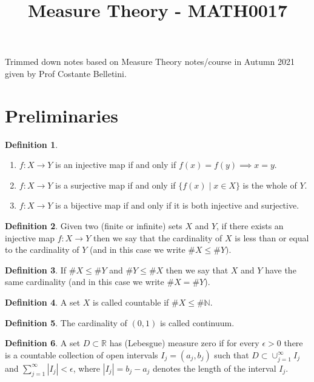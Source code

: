\documentclass[a4paper,14pt]{extarticle}
\theoremstyle{definition}
\newtheorem{definition}{Definition}
\begin{document}
\title{\textbf{Measure Theory - MATH0017}}
\author{}
\date{}
\maketitle

Trimmed down notes based on Measure Theory notes/course in Autumn 2021 given by Prof Costante Belletini.
\begingroup
\let\cleardoublepage\clearpage
\tableofcontents
\endgroup
\newpage
{}

\section{Preliminaries}
\begin{definition}
  \hfill
  \begin{enumerate}
    \item $f:X\rightarrow Y$ is an injective map if and only if $f(x)=f(y)\implies x= y$.
    \item $f:X\rightarrow Y$ is a surjective map if and only if $\{f(x)\mid x\in X\}$ is the whole of $Y$.
    \item $f:X\rightarrow Y$ is a bijective map if and only if it is both injective and surjective.
  \end{enumerate}
\end{definition}
\begin{definition}
  Given two (finite or infinite) sets 
  $X$ and $Y$, if there exists an 
  injective map $f:X\rightarrow Y$ then
  we say that the cardinality of $X$ 
  is less than or equal to the cardinality of $Y$ (and in this case
  we write $\#X\leq\#Y)$.
\end{definition}
\begin{definition}
  If $\#X\leq\#Y$ and $\#Y\leq\#X$ then 
  we say that $X$ and $Y$ have the same
  cardinality (and in this case we 
  write $\#X=\#Y$).
\end{definition}
\begin{definition}
  A set $X$ is called countable if 
  $\#X\leq \#\mathbb{N}$.
\end{definition}
\begin{definition}
  The cardinality of $(0,1)$ is called 
  continuum.
\end{definition}
\begin{definition}
  A set $D\subset\mathbb{R}$ has (Lebesgue) measure zero if for every
  $\epsilon>0$ there is a countable 
  collection of open intervals $I_j=
  (a_j,b_j)$ such that $D\subset\cup_{j=1}^\infty I_j$ and $\sum_{j=1}^\infty |I_j|<\epsilon$, where 
  $|I_j|=b_j-a_j$ denotes the length of 
  the interval $I_j$.
\end{definition}
\newpage
\end{document}
